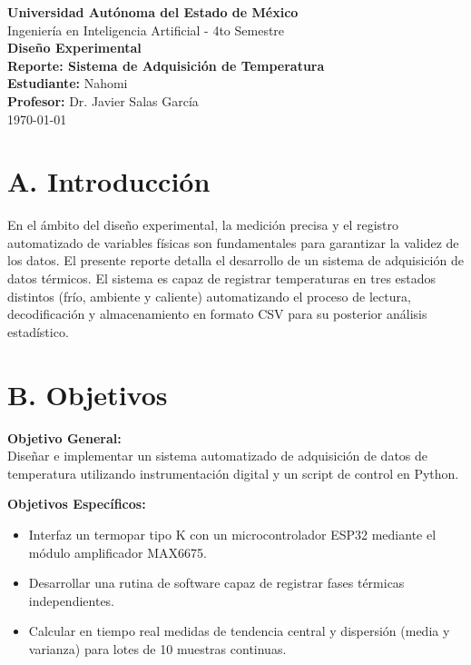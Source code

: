 \documentclass[12pt, a4paper]{article}
\begin{document}
\begin{titlepage}
    \centering
    {\Large \textbf{Universidad Autónoma del Estado de México}}\\[0.5cm]
    {\large Ingeniería en Inteligencia Artificial - 4to Semestre}\\[2cm]
    
    {\Large \textbf{Diseño Experimental}}\\[0.5cm]
    {\large \textbf{Reporte: Sistema de Adquisición de Temperatura}}\\[2cm]
    
    \textbf{Estudiante:} Nahomi\\[0.5cm]
    \textbf{Profesor:} Dr. Javier Salas García\\[2cm]
    
    \vfill
    {\large \today}
\end{titlepage}

\newpage
\tableofcontents
\newpage

\section*{A. Introducción}
En el ámbito del diseño experimental, la medición precisa y el registro automatizado de variables físicas son fundamentales para garantizar la validez de los datos. El presente reporte detalla el desarrollo de un sistema de adquisición de datos térmicos. El sistema es capaz de registrar temperaturas en tres estados distintos (frío, ambiente y caliente) automatizando el proceso de lectura, decodificación y almacenamiento en formato CSV para su posterior análisis estadístico.

\section*{B. Objetivos}
\textbf{Objetivo General:}\\
Diseñar e implementar un sistema automatizado de adquisición de datos de temperatura utilizando instrumentación digital y un script de control en Python.

\textbf{Objetivos Específicos:}
\begin{itemize}
    \item Interfaz un termopar tipo K con un microcontrolador ESP32 mediante el módulo amplificador MAX6675.
    \item Desarrollar una rutina de software capaz de registrar fases térmicas independientes.
    \item Calcular en tiempo real medidas de tendencia central y dispersión (media y varianza) para lotes de 10 muestras continuas.
\end{itemize}
\end{document}
